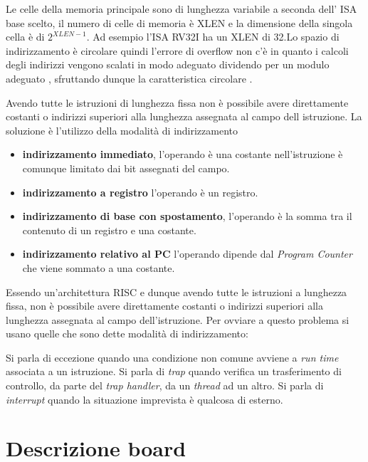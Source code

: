 \documentclass[12pt,a4paper]{report}
\begin{document}
Le celle della memoria principale sono di lunghezza variabile a seconda dell' ISA base scelto, il numero di celle di memoria è XLEN e la dimensione della singola cella è di $2^{XLEN - 1}$. Ad esempio l'ISA RV32I ha un XLEN di 32.Lo spazio di indirizzamento è circolare quindi l'errore di overflow non c'è in quanto i calcoli degli indirizzi vengono scalati in modo adeguato dividendo per un modulo adeguato , sfruttando dunque la caratteristica circolare \cite{ISA}.


Avendo tutte le istruzioni di lunghezza fissa non è possibile avere direttamente costanti o indirizzi superiori alla lunghezza assegnata al campo dell istruzione. La soluzione è l'utilizzo della modalità di indirizzamento
\begin{itemize}
	\item \textbf{indirizzamento immediato}, l’operando è una costante nell’istruzione è comunque limitato dai bit assegnati del campo.
	\item \textbf{indirizzamento a registro} l’operando è un registro.
	\item \textbf{indirizzamento di base con spostamento}, l’operando è la somma tra il
contenuto di un registro e una costante.
\item \textbf{indirizzamento relativo al PC} l'operando dipende dal \textit{Program Counter} che viene sommato a una costante.
\end{itemize}

Essendo un’architettura RISC e dunque avendo tutte le istruzioni a lunghezza fissa, non è possibile avere direttamente costanti o indirizzi superiori alla lunghezza assegnata al campo dell’istruzione. Per ovviare a questo problema si usano quelle che sono dette modalità di indirizzamento:

Si parla di eccezione quando una condizione non comune avviene a \textit{run time} associata a un istruzione.
Si parla di \textit{trap} quando verifica un trasferimento di controllo, da parte del \textit{trap handler}, da un  \textit{thread} ad un altro. Si parla di \textit{interrupt} quando la situazione imprevista è qualcosa di esterno.



\section{Descrizione board} 
\end{document}
